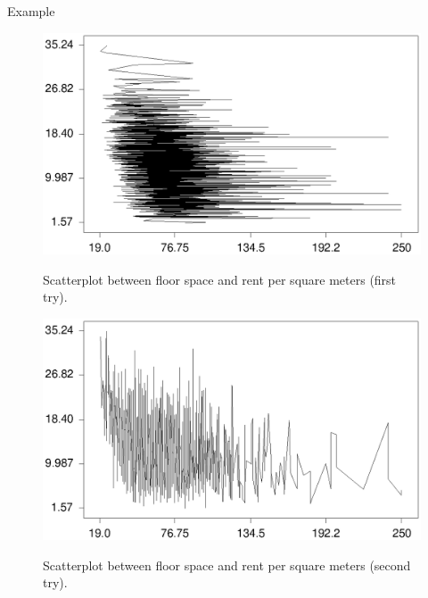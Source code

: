\begin{stanza}{Example}
{\begin{figure}[ht]
\begin{center}
\includegraphics[scale=0.7]{grafiken/plotrf1.ps}
{\em\caption{ \label{plotrf1} Scatterplot between floor space and
rent per square meters (first try).}}
\end{center}
\end{figure}

\begin{figure}[ht]
\begin{center}
\includegraphics[scale=0.7]{grafiken/plotrf2.ps}
{\em\caption{ \label{plotrf2} Scatterplot between floor space and
rent per square meters (second try).}}
\end{center}
\end{figure}

}
\end{stanza}
